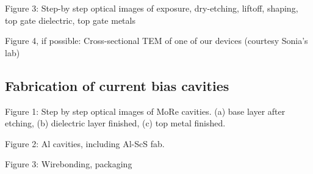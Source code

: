 Figure 3: Step-by step optical images of exposure, dry-etching, liftoff, shaping, top gate dielectric, top gate metals

Figure 4, if possible: Cross-sectional TEM of one of our devices (courtesy Sonia's lab)

\subsection{Fabrication of current bias cavities}


Figure 1: Step by step optical images of MoRe cavities. (a) base layer after etching, (b) dielectric layer finished, (c) top metal finished.

Figure 2: Al cavities, including Al-ScS fab.

Figure 3: Wirebonding, packaging